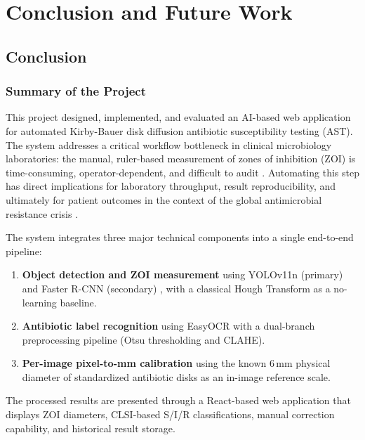 \chapter{Conclusion and Future Work}

\section{Conclusion}
\label{sec:conclusion}

\subsection{Summary of the Project}

This project designed, implemented, and evaluated an AI-based web application
for automated Kirby-Bauer disk diffusion antibiotic susceptibility testing (AST).
The system addresses a critical workflow bottleneck in clinical microbiology laboratories:
the manual, ruler-based measurement of zones of inhibition (ZOI) is time-consuming,
operator-dependent, and difficult to audit \cite{humphries2018}.
Automating this step has direct implications for laboratory throughput,
result reproducibility, and ultimately for patient outcomes in the context of
the global antimicrobial resistance crisis \cite{who_amr2022}.

The system integrates three major technical components into a single end-to-end pipeline:

\begin{enumerate}
  \item \textbf{Object detection and ZOI measurement} using YOLOv11n (primary) \cite{wang2024yolov11}
        and Faster R-CNN (secondary) \cite{ren2015faster},
        with a classical Hough Transform as a no-learning baseline.
  \item \textbf{Antibiotic label recognition} using EasyOCR \cite{baek2019craft}
        with a dual-branch preprocessing pipeline (Otsu thresholding and CLAHE).
  \item \textbf{Per-image pixel-to-mm calibration} using the known 6\,mm physical
        diameter of standardized antibiotic disks as an in-image reference scale.
\end{enumerate}

The processed results are presented through a React-based web application
that displays ZOI diameters, CLSI-based S/I/R classifications,
manual correction capability, and historical result storage.

